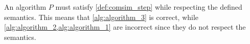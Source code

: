 An algorithm $P$ must satisfy \cref{def:comsim_step} while respecting the defined semantics.
This means that \cref{alg:algorithm_3} is correct, while \cref{alg:algorithm_2,alg:algorithm_1} are incorrect since they do not respect the semantics.

